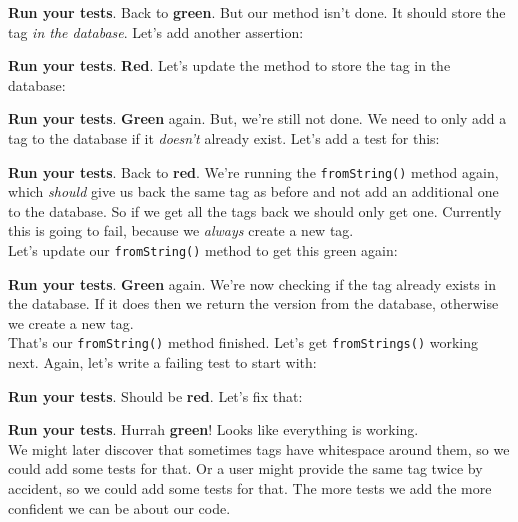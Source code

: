 

\textbf{Run your tests}. Back to \textbf{green}. But our method isn't done. It should store the tag \textit{in the database}. Let's add another assertion:


\textbf{Run your tests}. \textbf{Red}. Let's update the method to store the tag in the database:


\textbf{Run your tests}. \textbf{Green} again. But, we're still not done. We need to only add a tag to the database if it \textit{doesn't} already exist. Let's add a test for this:


\textbf{Run your tests}. Back to \textbf{red}. We're running the \texttt{fromString()} method again, which \textit{should} give us back the same tag as before and not add an additional one to the database. So if we get all the tags back we should only get one. Currently this is going to fail, because we \textit{always} create a new tag.
\\

Let's update our \texttt{fromString()} method to get this green again:



\textbf{Run your tests}. \textbf{Green} again. We're now checking if the tag already exists in the database. If it does then we return the version from the database, otherwise we create a new tag.
\\

That's our \texttt{fromString()} method finished. Let's get \texttt{fromStrings()} working next. Again, let's write a failing test to start with:



\textbf{Run your tests}. Should be \textbf{red}. Let's fix that:



\textbf{Run your tests}. Hurrah \textbf{green}! Looks like everything is working.
\\

We might later discover that sometimes tags have whitespace around them, so we could add some tests for that. Or a user might provide the same tag twice by accident, so we could add some tests for that. The more tests we add the more confident we can be about our code.
\\


